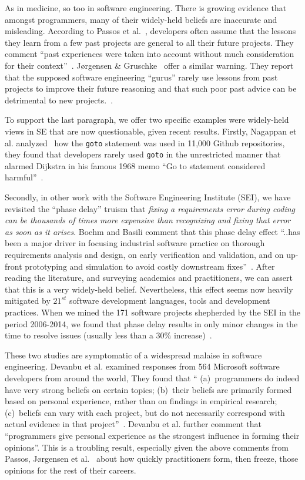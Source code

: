 \documentclass{sig-alternate}
\begin{document}
As in medicine, so too in software engineering.
There is growing evidence that amongst programmers,
many of their  widely-held beliefs are inaccurate and misleading. 
According to Passos et al.~\cite{passos11},  developers often  assume that the lessons they learn from a few past projects are general to all their future projects. They comment ``past experiences were taken into account without much consideration for their context''~\cite{passos11}.  J{\o}rgensen \& Gruschke~\cite{jorgensen09} offer a similar warning. They report that the supposed software engineering ``gurus'' rarely use lessons from past projects to improve their future reasoning and that such poor past advice can be detrimental to new projects.~\cite{jorgensen09}. 

To support the last paragraph, we offer two
specific examples
were  widely-held views in SE that are   now questionable, given recent results. 
Firstly, Nagappan et al. analyzed~\cite{mei15} 
how the {\tt goto} statement was used  in 11,000 Github repositories, 
they found that developers
rarely used {\tt goto} in the unrestricted manner that alarmed Dijkstra in his famous 1968
memo ``Go to statement considered harmful''~\cite{Dijkstra68}.
 
Secondly, in other work with the Software Engineering Institute (SEI), we have revisited
the ``phase delay'' truism that {\em fixing a requirements error  during
coding can be thousands of times more expensive than recognizing and fixing that error
as soon as it arises}. Boehm and Basili comment that this phase delay effect
``..has been a major driver in focusing industrial software practice on thorough requirements analysis and design, on early verification and validation, and on up-front prototyping and simulation to avoid costly downstream fixes''~\cite{boehm01}.
After reading the literature, and surveying academics
and practitioners, we can assert that this is a very widely-held belief. Nevertheless,
this effect seems now heavily mitigated by $21^{st}$ software development languages,
tools and development practices.  When we mined the 171 software projects shepherded
by the SEI in the period 2006-2014, we found that phase delay results
in only minor changes in the 
time to resolve issues (usually less than a 30\% increase)~\cite{me16phase}.

These two studies are symptomatic
of a widespread malaise in software engineering.
Devanbu et al.  examined responses from 564 Microsoft software developers from around
the world, They found that  `` (a)~programmers do indeed have very
strong beliefs on certain topics; (b)~their beliefs are primarily formed
based on personal experience, rather than on findings in empirical
research; (c)~beliefs can vary with each project, but do not necessarily
correspond with actual evidence in that project''~\cite{prem16}.
Devanbu et al. further  comment that ``programmers give personal experience
as the strongest influence in forming their opinions''. This is a troubling
result, especially given the above comments from Passos,  J{\o}rgensen et al.~\cite{passos11,jorgensen09} about how quickly practitioners form, then freeze, those opinions for the rest of their
careers.
\end{document}
